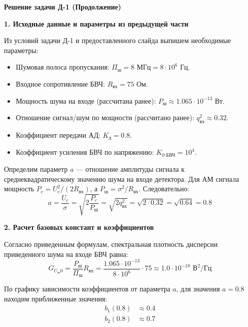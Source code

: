 \textbf{Решение задачи Д-1 (Продолжение)}

\vspace{1em}
\textbf{1. Исходные данные и параметры из предыдущей части}

Из условий задачи Д-1 и предоставленного слайда выпишем необходимые параметры:
\begin{itemize}
    \item Шумовая полоса пропускания: $\Pi_{\text{ш}} = 8 \text{ МГц} = 8 \cdot 10^6 \text{ Гц}$.
    \item Входное сопротивление БВЧ: $R_{\text{вх}} = 75 \text{ Ом}$.
    \item Мощность шума на входе (рассчитана ранее): $P_{\text{ш}} \approx 1.065 \cdot 10^{-13} \text{ Вт}$.
    \item Отношение сигнал/шум по мощности (рассчитано ранее): $q_{\text{вх}}^2 \approx 0.32$.
    \item Коэффициент передачи АД: $K_{\text{д}} = 0.8$.
    \item Коэффициент усиления БВЧ по напряжению: $K_{0 \text{ БВЧ}} = 10^4$.
\end{itemize}

Определим параметр $a$ — отношение амплитуды сигнала к среднеквадратическому значению шума на входе детектора. Для АМ сигнала мощность $P_c = U_c^2 / (2R_{\text{вх}})$, а $P_{\text{ш}} = \sigma^2 / R_{\text{вх}}$. Следовательно:
\begin{equation*}
    a = \frac{U_c}{\sigma} = \sqrt{2 \frac{P_c}{P_{\text{ш}}}} = \sqrt{2 q_{\text{вх}}^2} = \sqrt{2 \cdot 0.32} = \sqrt{0.64} = 0.8
\end{equation*}

\vspace{1em}
\textbf{2. Расчет базовых констант и коэффициентов}

Согласно приведенным формулам, спектральная плотность дисперсии приведенного шума на входе БВЧ равна:
\begin{equation*}
    G_{U_{\text{ш}}0} = \frac{P_{\text{ш}}}{\Pi_{\text{ш}}} R_{\text{вх}} = \frac{1.065 \cdot 10^{-13}}{8 \cdot 10^6} \cdot 75 \approx 1.0 \cdot 10^{-18} \text{ В}^2/\text{Гц}
\end{equation*}

По графику зависимости коэффициентов от параметра $a$, для значения $a = 0.8$ находим приближенные значения:
\begin{align*}
    b_1(0.8) &\approx 0.4 \\
    b_2(0.8) &\approx 0.7
\end{align*}

